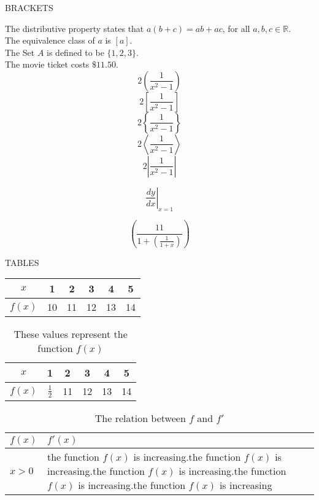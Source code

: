 \documentclass[11pt]{article}
\begin{document}
BRACKETS
\vspace{2cm}

The distributive property states that $a(b+c) = ab + ac$, for all $a,b,c \in \mathbb{R}$.\\[6pt]
The equivalence class of $a$ is $[a]$.\\[6pt]
The Set $A$ is defined to be $\{1,2,3\}$.\\[6pt]
The movie ticket costs $\$11.50.$\\[6pt]
$$2\left(\frac{1}{x^2-1}\right)$$
$$2\left[\frac{1}{x^2-1}\right]$$
$$2\left\{\frac{1}{x^2-1}\right\}$$
$$2\left \langle     \frac{1}{x^2-1}\right  \rangle   $$
$$2\left |     \frac{1}{x^2-1}\right  |   $$

$$ \left.\frac{dy}{dx}\right|_{x=1}  $$

$$\left(\frac{11}{1+\left(\frac{1}{1+x}\right)}\right)$$

TABLES
\vspace{1cm}

\begin{tabular}{|c||c|c|c|c|c|}
	\hline
	$x$ & 1 & 2 & 3 & 4 & 5 \\ \hline
	$f(x)$ & 10 & 11 & 12 & 13 & 14 \\ \hline
\end{tabular}

\vspace{1cm}


\begin{table}[H]
\centering
\def\arraystretch{1.5}
\begin{tabular}{|c||c|c|c|c|c|}
	\hline
	$x$ & 1 & 2 & 3 & 4 & 5 \\ \hline
	$f(x)$ & $\frac{1}{2}$ & 11 & 12 & 13 & 14 \\ \hline
\end{tabular}
\caption{These values represent the function $f(x)$}
\end{table}

\vspace{1cm}

\begin{table}[H]
\centering
\def\arraystretch{1.5}
\begin{tabular}{|l|p{3in}|}
	\hline
	$f(x)$ & $f'(x)$ \\ \hline
	$x>0$ & the function $f(x)$ is increasing.the function $f(x)$ is increasing.the function $f(x)$ is increasing.the function $f(x)$ is increasing.the function $f(x)$ is increasing \\ \hline
\end{tabular}
\caption{The relation between $f$ and $f'$}
\end{table}
\end{document}
